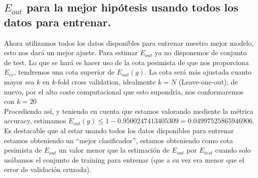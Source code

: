\documentclass[11pt,a4paper]{article}
\theoremstyle{definition}
\begin{document}
	\subsection{$E_{out}$ para la mejor hipótesis usando todos los datos para entrenar.}
	Ahora utilizamos todos los datos disponibles para entrenar nuestro mejor modelo, esto nos dará un mejor ajuste. Para estimar $E_{out}$ ya no disponemos de conjunto de test. Lo que se hará es hacer uso de la cota pesimista de que nos proporciona $E_{cv}$, tendremos una cota superior de $E_{out}(g)$. La cota será más ajustada cuanto mayor sea $k$ en $k$-fold cross validation, idealmente $k=N$ (Leave-one-out); de nuevo, por el alto coste computacional que esto supondría, nos conformaremos con $k=20$\\
	Procediendo así, y teniendo en cuenta que estamos valorando mediente la métrica accuracy, estimamos $E_{out}(g)\leq 1-0.9500247413405309=0.04997525865946906$. Es destacable que al estar usando todos los datos disponibles para entrenar estamos obteniendo un ``mejor clasificador'', estamos obteniendo como cota pesimista de $E_{out}$ un valor menor que la estimación de $E_{out}$ por $E_{test}$ cuando solo usábamos el conjunto de training para entrenar (que a su vez era menor que el error de validación cruzada).
	
	
	
\end{document}
